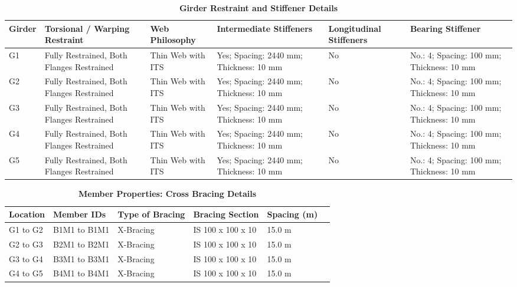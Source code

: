 \documentclass[12pt,a4paper]{report}
\numberwithin{table}{chapter}
\numberwithin{figure}{chapter}
\begin{document}
\vspace{0.6em}

\vspace{4pt}
\begin{longtable}{|L{1.4cm}|p{2.2cm}|p{2.2cm}|p{3.0cm}|p{2.4cm}|p{2.2cm}|}
\caption{\textbf{Girder Restraint and Stiffener Details}}\\
\hline
\textbf{Girder} & \textbf{Torsional / Warping Restraint} & \textbf{Web Philosophy} & \textbf{Intermediate Stiffeners} & \textbf{Longitudinal Stiffeners} & \textbf{Bearing Stiffener} \\[6pt]
\hline
\endfirsthead
\endhead

G1 & Fully Restrained, Both Flanges Restrained & Thin Web with ITS & Yes; Spacing: 2440 mm; Thickness: 10 mm & No & No.: 4; Spacing: 100 mm; Thickness: 10 mm \\[8pt]
\hline
G2 & Fully Restrained, Both Flanges Restrained & Thin Web with ITS & Yes; Spacing: 2440 mm; Thickness: 10 mm & No & No.: 4; Spacing: 100 mm; Thickness: 10 mm \\[8pt]
\hline
G3 & Fully Restrained, Both Flanges Restrained & Thin Web with ITS & Yes; Spacing: 2440 mm; Thickness: 10 mm & No & No.: 4; Spacing: 100 mm; Thickness: 10 mm \\[8pt]
\hline
G4 & Fully Restrained, Both Flanges Restrained & Thin Web with ITS & Yes; Spacing: 2440 mm; Thickness: 10 mm & No & No.: 4; Spacing: 100 mm; Thickness: 10 mm \\[8pt]
\hline
G5 & Fully Restrained, Both Flanges Restrained & Thin Web with ITS & Yes; Spacing: 2440 mm; Thickness: 10 mm & No & No.: 4; Spacing: 100 mm; Thickness: 10 mm \\[8pt]
\hline
\end{longtable}



\newpage

\vspace{0.4em}
\setlength{\tabcolsep}{4pt}
\setlength\LTleft{0pt}
\setlength\LTright{\fill}

\begin{longtable}{|L{2.2cm}|L{2.2cm}|L{3.0cm}|L{2.5cm}|C{1.8cm}|C{1.8cm}|}
\caption{\textbf{Member Properties: Cross Bracing Details}}
\hline
\textbf{Location} & \textbf{Member IDs} & \textbf{Type of Bracing} & \textbf{Bracing Section} & \textbf{Spacing (m)} \\
\hline
G1 to G2 & B1M1 to B1M1 & X-Bracing & IS 100 x 100 x 10 & 15.0 m \\[6pt]
\hline
G2 to G3 & B2M1 to B2M1 & X-Bracing & IS 100 x 100 x 10 & 15.0 m \\[6pt]
\hline
G3 to G4 & B3M1 to B3M1 & X-Bracing & IS 100 x 100 x 10 & 15.0 m \\[6pt]
\hline
G4 to G5 & B4M1 to B4M1 & X-Bracing & IS 100 x 100 x 10 & 15.0 m \\[6pt]
\hline
\end{longtable}
\end{document}
